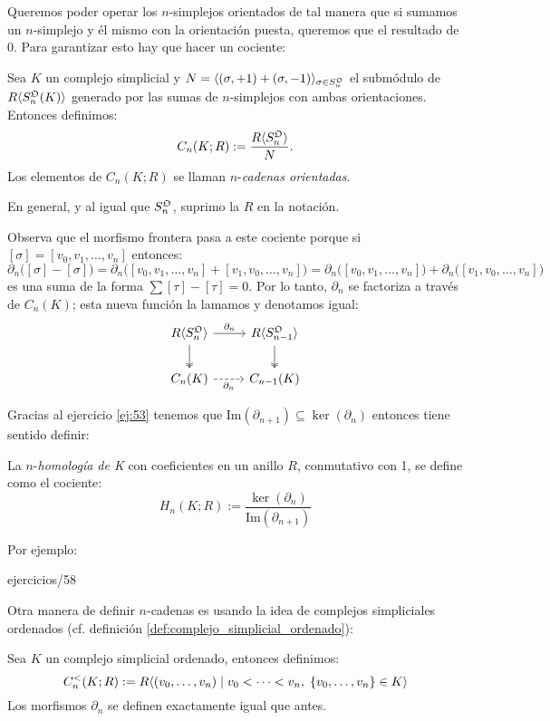 \documentclass[../../topologia_algebraica]{subfiles}
\begin{document}
Queremos poder operar los $n$-simplejos orientados de tal manera que si sumamos un $n$-simplejo
y \'el mismo con la orientaci\'on puesta, queremos que el resultado de 0. Para garantizar esto hay
que hacer un cociente:

\begin{defin}
	Sea $K$ un complejo simplicial y $N=\langle (\sigma,+1)+(\sigma,-1) \rangle_{\sigma\in S_n^{\mathfrak{O}}}$ el
	subm\'odulo de $R\langle S_n^{\mathfrak{O}}(K) \rangle$ generado por las sumas de $n$-simplejos con ambas
	orientaciones. Entonces definimos:
	\[
		C_n(K;R):=\frac{R\langle S_n^{\mathfrak{O}} \rangle}{N}.
	\]
	Los elementos de $C_n(K;R)$ se llaman $n$-\emph{cadenas orientadas}.
\end{defin}

En general, y al igual que $S_n^{\mathfrak{O}}$, suprimo la $R$ en la notaci\'on.

Observa que el morfismo frontera pasa a este cociente porque si $[\sigma]=[v_0,v_1,\ldots,v_n]$ entonces:
\[
	\partial_n\big( [\sigma]-[\sigma]\big)=
	\partial_n\big([v_0,v_1,\ldots,v_n]+[v_1,v_0,\ldots,v_n]\big)=
	\partial_n\big([v_0,v_1,\ldots,v_n]\big)+\partial_n\big([v_1,v_0,\ldots,v_n]\big)
\]
es una suma de la forma $\sum [\tau]-[\tau]=0$. Por lo tanto, $\partial_n$ se factoriza a trav\'es de
$C_n(K)$; esta nueva funci\'on la lamamos y denotamos igual:
\[
	\begin{tikzcd}
		R\gen{S_{n}^\fO} \arrow[r,"\partial_n"] \arrow[d,two heads] & R\gen{S_{n-1}^\fO} \arrow[d,two heads] \\
		C_n(K) \arrow[r,dashed,"\partial_n"'] & C_{n-1}(K)
	\end{tikzcd}
\]

Gracias al ejercicio \ref{ej:53} tenemos que Im$(\partial_{n+1})\subseteq\ker(\partial_{n})$ entonces tiene
sentido definir:

\begin{defin}
	La $n$-\emph{homolog\'ia de K} con coeficientes en un anillo $R$, conmutativo con 1, se define como
	el cociente:
	\[
		H_n(K;R):=\frac{\ker(\partial_n)}{\text{Im}(\partial_{n+1})}
	\]
\end{defin}

Por ejemplo:

{ejercicios/58} %

Otra manera de definir $n$-cadenas es usando la idea de complejos simpliciales ordenados
(cf. definici\'on \ref{def:complejo_simplicial_ordenado}):

\begin{defin}
	Sea $K$ un complejo simplicial ordenado, entonces definimos:
	\[
		C_n^<(K;R):=R\langle (v_0,\ldots,v_n)\mid v_0<\cdots<v_n,\;\{v_0,\ldots,v_n\}\in K \rangle
	\]
	Los morfismos $\partial_n$ se definen exactamente igual que antes.
\end{defin}
\end{document}
